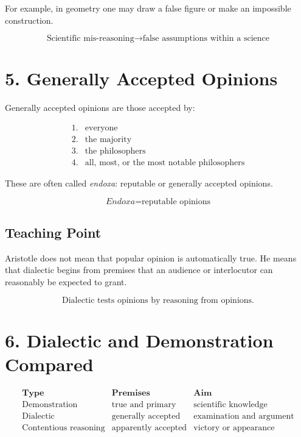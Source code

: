 \documentclass[12pt]{article}
\begin{document}
For example, in geometry one may draw a false figure or make an impossible
construction.

\[
\boxed{
\text{Scientific mis-reasoning} \rightarrow \text{false assumptions within a science}
}
\]

\section*{5. Generally Accepted Opinions}

Generally accepted opinions are those accepted by:

\[
\begin{array}{ll}
1. & \text{everyone} \\
2. & \text{the majority} \\
3. & \text{the philosophers} \\
4. & \text{all, most, or the most notable philosophers}
\end{array}
\]

These are often called \textit{endoxa}: reputable or generally accepted
opinions.

\[
\boxed{
\textit{Endoxa} = \text{reputable opinions}
}
\]

\subsection*{Teaching Point}

Aristotle does not mean that popular opinion is automatically true. He means
that dialectic begins from premises that an audience or interlocutor can
reasonably be expected to grant.

\[
\boxed{
\text{Dialectic tests opinions by reasoning from opinions.}
}
\]

\section*{6. Dialectic and Demonstration Compared}

\[
\begin{array}{c|c|c}
\textbf{Type} & \textbf{Premises} & \textbf{Aim} \\
\hline
\text{Demonstration} & \text{true and primary} & \text{scientific knowledge} \\
\text{Dialectic} & \text{generally accepted} & \text{examination and argument} \\
\text{Contentious reasoning} & \text{apparently accepted} & \text{victory or appearance} \\
\end{array}
\]
\end{document}
